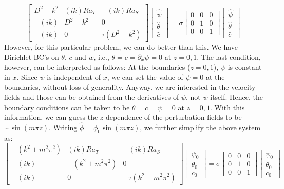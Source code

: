 \documentclass{article}
\begin{document}
\begin{equation}
 \begin{bmatrix}
  D^{2} - k^{2} & (ik) Ra_{T} & -(ik)Ra_{S}\\
  -(ik) & D^{2} - k^{2} & 0 \\
  -(ik) & 0 & \tau(D^{2} - k^{2})
 \end{bmatrix}
 \begin{bmatrix}
  \hat{\psi}\\
  \hat{\theta}\\
  \hat{c}
 \end{bmatrix}
 = \sigma \begin{bmatrix}
           0 & 0 & 0\\
           0 & 1 & 0\\
           0 & 0 & 1
          \end{bmatrix}
%
 \begin{bmatrix}
  \hat{\psi}\\
  \hat{\theta}\\
  \hat{c}
 \end{bmatrix}
\end{equation}
However, for this particular problem, we can do better than this. We have Dirichlet BC's on $\theta$, $c$ and $w$, i.e., $\theta = c = \partial_{x}\psi = 0 $ at $z = 0, 1$. The last condition, however, can be interpreted as follows: At the boundaries ($z = 0, 1$), $\psi$ is constant in $x$. Since $\psi$ is independent of $x$, we can set the value of $\psi = 0$ at the boundaries, without loss of generality. Anyway, we are interested in the velocity fields and those can be obtained from the derivatives of $\psi$, not $\psi$ itself. Hence, the boundary conditions can be taken to be $\theta = c = \psi = 0 $ at $z = 0, 1$. With this information, we can guess the $z$-dependence of the perturbation fields to be $\sim \sin(m\pi z)$. Writing $\hat{\phi} = \phi_{0} \sin(m\pi z)$, we further simplify the above system as:
\begin{equation}\label{eq:eigenproblem}
 \begin{bmatrix}
  -(k^{2} + m^{2}\pi^{2}) & (ik) Ra_{T} & -(ik)Ra_{S}\\
  -(ik) & -(k^{2} + m^{2}\pi^{2}) & 0 \\
  -(ik) & 0 & -\tau(k^{2} + m^{2}\pi^{2})
 \end{bmatrix}
 \begin{bmatrix}
  \psi_{0}\\
  \theta_{0}\\
  c_{0}
 \end{bmatrix}
 = \sigma \begin{bmatrix}
           0 & 0 & 0\\
           0 & 1 & 0\\
           0 & 0 & 1
          \end{bmatrix}
%
 \begin{bmatrix}
  \psi_{0}\\
  \theta_{0}\\
  c_{0}
 \end{bmatrix}
\end{equation}
\end{document}
